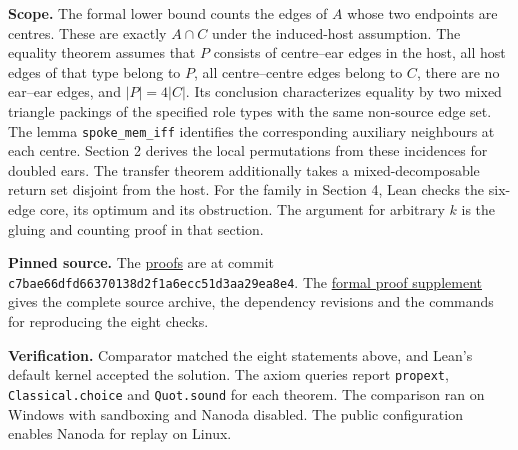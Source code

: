 \documentclass[english,11pt,a4paper]{article}
\begin{document}
\textbf{Scope.} The formal lower bound counts the edges of \(A\) whose two endpoints are centres. These are exactly \(A\cap C\) under the induced-host assumption. The equality theorem assumes that \(P\) consists of centre--ear edges in the host, all host edges of that type belong to \(P\), all centre--centre edges belong to \(C\), there are no ear--ear edges, and \(|P|=4|C|\). Its conclusion characterizes equality by two mixed triangle packings of the specified role types with the same non-source edge set. The lemma \texttt{spoke\_mem\_iff} identifies the corresponding auxiliary neighbours at each centre. Section 2 derives the local permutations from these incidences for doubled ears. The transfer theorem additionally takes a mixed-decomposable return set disjoint from the host. For the family in Section 4, Lean checks the six-edge core, its optimum and its obstruction. The argument for arbitrary \(k\) is the gluing and counting proof in that section.

\textbf{Pinned source.} The \href{https://github.com/jtraverso/typed-triangle-absorption/tree/c7bae66dfd66370138d2f1a6ecc51d3aa29ea8e4}{proofs} are at commit \nolinkurl{c7bae66dfd66370138d2f1a6ecc51d3aa29ea8e4}. The \href{https://github.com/jtraverso/nash-williams-triangle-decompositions-release/tree/doubled-ears-preprint-1.0-r3/series_notes/DOUBLED_EAR_ABSORBERS/preprint-1.0/formalization}{formal proof supplement} gives the complete source archive, the dependency revisions and the commands for reproducing the eight checks.

\textbf{Verification.} Comparator matched the eight statements above, and Lean's default kernel accepted the solution. The axiom queries report \texttt{propext}, \texttt{Classical.choice} and \texttt{Quot.sound} for each theorem. The comparison ran on Windows with sandboxing and Nanoda disabled. The public configuration enables Nanoda for replay on Linux.
\end{document}
